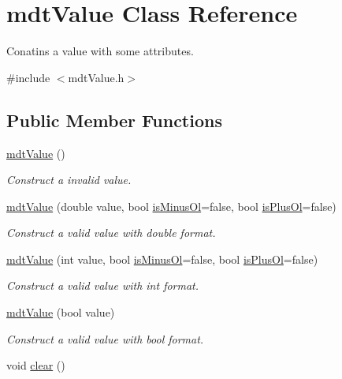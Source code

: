 \hypertarget{classmdt_value}{\section{mdt\-Value Class Reference}
\label{classmdt_value}
}


Conatins a value with some attributes.  




{\ttfamily \#include $<$mdt\-Value.\-h$>$}

\subsection*{Public Member Functions}
\begin{DoxyCompactItemize}
\item 
\hyperlink{classmdt_value_a5eaad5ce886d11b6b3484525a8fa7f41}{mdt\-Value} ()
\begin{DoxyCompactList}\small\item\em Construct a invalid value. \end{DoxyCompactList}\item 
\hyperlink{classmdt_value_a3aafb3f186d3132a6bd3bf5f9238b04b}{mdt\-Value} (double value, bool \hyperlink{classmdt_value_a4de0d0c8a02cdd4c02adace4108db326}{is\-Minus\-Ol}=false, bool \hyperlink{classmdt_value_a033ad1d20812dddf38530a5f190033da}{is\-Plus\-Ol}=false)
\begin{DoxyCompactList}\small\item\em Construct a valid value with double format. \end{DoxyCompactList}\item 
\hyperlink{classmdt_value_a023f1f91105ae7ea1040618c5a600b36}{mdt\-Value} (int value, bool \hyperlink{classmdt_value_a4de0d0c8a02cdd4c02adace4108db326}{is\-Minus\-Ol}=false, bool \hyperlink{classmdt_value_a033ad1d20812dddf38530a5f190033da}{is\-Plus\-Ol}=false)
\begin{DoxyCompactList}\small\item\em Construct a valid value with int format. \end{DoxyCompactList}\item 
\hyperlink{classmdt_value_a0d6a8c5abbb4192f6dbcecc698c53b65}{mdt\-Value} (bool value)
\begin{DoxyCompactList}\small\item\em Construct a valid value with bool format. \end{DoxyCompactList}\item 
void \hyperlink{classmdt_value_a8c4461857e4715e49b2050479d63bfb8}{clear} ()

\end{DoxyCompactItemize}
